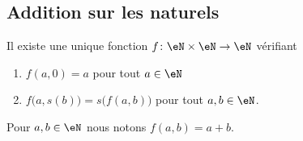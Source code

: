 \subsection{Addition sur les naturels}
\label{SUBooAdditionNaturels}

\begin{propositionDef}      \label{PROPooVFOXooXmwpFh}
	Il existe une unique fonction \( f\colon \eN\times \eN\to \eN\) vérifiant
	\begin{enumerate}
		\item       \label{ITEMooILZSooNYIkYR}
		      \( f(a,0)=a\) pour tout \( a\in \eN\)
		\item       \label{ITEMooZWHQooBAjZyE}
		      \( f\big( a,s(b) \big)=s\big( f(a,b) \big)\) pour tout \( a,b\in \eN\).
	\end{enumerate}
	Pour \( a,b\in \eN\) nous notons \( f(a,b)=a+b\).
\end{propositionDef}

